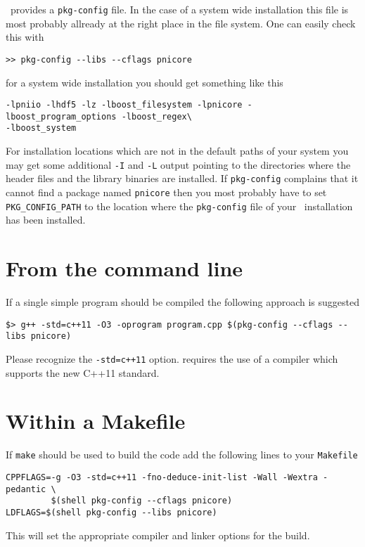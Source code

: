 \libpnicore\ provides a {\tt pkg-config} file. In the case of a system wide
installation this file is most probably allready at the right place in the file
system. One can easily check this with 
\begin{verbatim}
>> pkg-config --libs --cflags pnicore 
\end{verbatim}
for a system wide installation you should get something like this
\begin{verbatim}
-lpniio -lhdf5 -lz -lboost_filesystem -lpnicore -lboost_program_options -lboost_regex\
-lboost_system 
\end{verbatim}
For installation locations which are not in the default paths of your system you
may get some additional {\tt -I} and {\tt -L} output pointing to the directories
where the header files and the library binaries are installed.
If {\tt pkg-config} complains that it cannot find a package named {\tt pnicore}
then you most probably have to set {\tt PKG\_CONFIG\_PATH} to the location where 
the {\tt pkg-config} file of your \libpnicore\ installation has been installed. 

\section{From the command line}

If a single simple program should be compiled the following approach is
suggested 
\begin{verbatim}
$> g++ -std=c++11 -O3 -oprogram program.cpp $(pkg-config --cflags --libs pnicore)
\end{verbatim}
Please recognize the {\tt -std=c++11} option. \libpnicore requires the use of a
compiler which supports the new C++11 standard.


\section{Within a Makefile}

If {\tt make} should be used to build the code add the following lines to your
{\tt Makefile}

\begin{verbatim}
CPPFLAGS=-g -O3 -std=c++11 -fno-deduce-init-list -Wall -Wextra -pedantic \
		 $(shell pkg-config --cflags pnicore) 
LDFLAGS=$(shell pkg-config --libs pnicore)
\end{verbatim}
This will set the appropriate compiler and linker options for the build.


